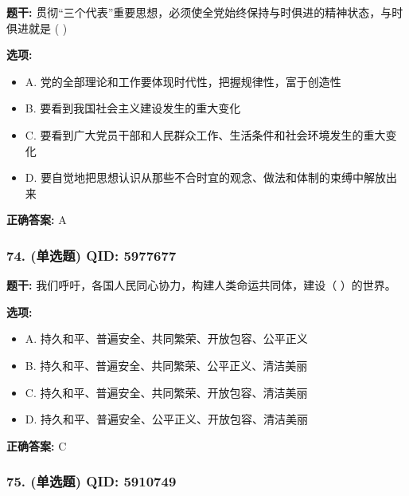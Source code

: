 \documentclass[12pt,UTF8]{ctexart}
\begin{document}
\textbf{题干:}
贯彻“三个代表”重要思想，必须使全党始终保持与时俱进的精神状态，与时俱进就是  ( )

\textbf{选项:}
\begin{itemize}[leftmargin=*]

  \item A. 党的全部理论和工作要体现时代性，把握规律性，富于创造性

  \item B. 要看到我国社会主义建设发生的重大变化

  \item C. 要看到广大党员干部和人民群众工作、生活条件和社会环境发生的重大变化

  \item D. 要自觉地把思想认识从那些不合时宜的观念、做法和体制的束缚中解放出来

\end{itemize}

\textbf{正确答案:}
A

\vspace{0.3em}\hrulefill\vspace{0.7em}

\subsubsection*{74. (单选题) \small QID: 5977677}

\textbf{题干:}
我们呼吁，各国人民同心协力，构建人类命运共同体，建设（ ）的世界。

\textbf{选项:}
\begin{itemize}[leftmargin=*]

  \item A. 持久和平、普遍安全、共同繁荣、开放包容、公平正义

  \item B. 持久和平、普遍安全、共同繁荣、公平正义、清洁美丽

  \item C. 持久和平、普遍安全、共同繁荣、开放包容、清洁美丽

  \item D. 持久和平、普遍安全、公平正义、开放包容、清洁美丽

\end{itemize}

\textbf{正确答案:}
C

\vspace{0.3em}\hrulefill\vspace{0.7em}

\subsubsection*{75. (单选题) \small QID: 5910749}
\end{document}
